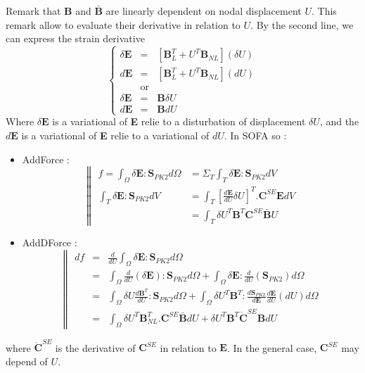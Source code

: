 \documentclass[a4paper,10pt]{article}
\begin{document}
Remark that $\textbf{B}$ and $\bar{\textbf{B}}$ are linearly dependent on nodal displacement $U$. This remark allow to evaluate their derivative in relation to $U$. By the second line, we can express the strain derivative 
\[
\left\{ 
\begin{array}{rcl}
\delta \textbf{E}  &=& [ \textbf{B}^T_L +  U^T \textbf{B}_{NL} ] (\delta U)                 \\  
d \textbf{E}       &=& [ \textbf{B}^T_L +  U^T \textbf{B}_{NL} ] (dU)                       \\
            &\text{or} &                                                                    \\
\delta \textbf{E}  &=& \textbf{B} \delta U                                                  \\  
d \textbf{E}       &=& \textbf{B} dU                        
\end{array}\right.
\]
Where $\delta \textbf{E}$ is a variational of \textbf{E} relie to a disturbation of displacement $\delta U$, and the $d \textbf{E}$ is a variational of \textbf{E} relie to a variational of $d U$. In SOFA so : 
\begin{itemize}
 \item AddForce :
      \[
      \left\| 
      \begin{array}{ll}
      f = \int_\Omega  \delta \textbf{E} : \textbf{S}_{PK2}  d\Omega  &= \Sigma_{T} \int_{T}  \delta \textbf{E} : \textbf{S}_{PK2}  dV    \\   
      \int_{T}     \delta \textbf{E} : \textbf{S}_{PK2}  dV             &= \int_{T}  [\frac{d\textbf{E}}{dU}\delta U ]^T . \textbf{C}^{SE} \textbf{E}  dV \\
								       &= \int_{T}  \delta U^T \textbf{B}^T \textbf{C}^{SE}\bar{\textbf{B}} U
      \end{array}\right.
      \]
 \item AddDForce :
      \[
      \left\| 
      \begin{array}{rcl}
      df  &=& \frac{d}{dU}\int_\Omega  \delta \textbf{E} : \textbf{S}_{PK2}  d\Omega     \\    
	  &=& \int_\Omega \frac{d}{dU}( \delta \textbf{E} ): \textbf{S}_{PK2}  d\Omega    + \int_\Omega \delta \textbf{E} : \frac{d}{dU}( \textbf{S}_{PK2})  d\Omega   \\ 
	  &=& \int_\Omega \delta U \frac{d \textbf{B}^T }{dU}: \textbf{S}_{PK2}  d\Omega    + 
                            \int_\Omega  \delta U^T \textbf{B}^T : \frac{d\textbf{S}_{PK2}}{d\textbf{E}} \frac{d\textbf{E}}{dU}(dU)  d\Omega   \\   
	  &=& \int_\Omega \delta U^T \textbf{B}^T_{NL}.\textbf{C}^{SE} \bar{\textbf{B}} dU     + \delta U^T \textbf{B}^T \dot{\textbf{C}}^{SE} \textbf{B} dU
      \end{array}\right.
      \]

\end{itemize}
where $\dot{\textbf{C}}^{SE}$ is the derivative of $\textbf{C}^{SE}$ in relation to $\textbf{E}$. In the general case, $\textbf{C}^{SE}$ may depend of $U$.
\end{document}
